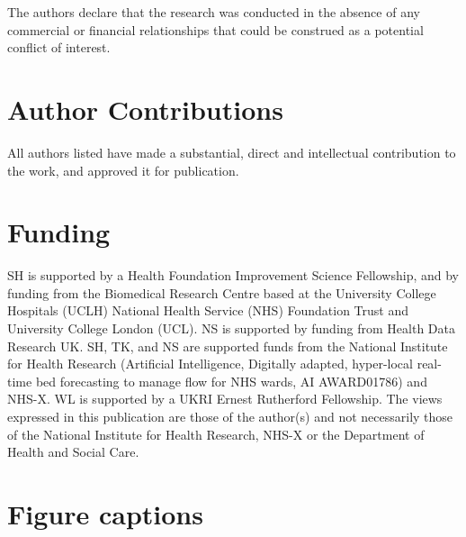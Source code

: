 \documentclass[utf8]{FrontiersinVancouver}
\begin{document}
The authors declare that the research was conducted in the absence of any commercial or financial relationships that could be construed as a potential conflict of interest.

\section*{Author Contributions}
All authors listed have made a substantial, direct and intellectual contribution to the work, and approved it for publication.

\section*{Funding}

SH is supported by a Health Foundation Improvement Science Fellowship, and by funding from  the Biomedical Research Centre based at the University College Hospitals (UCLH) National Health Service (NHS) Foundation Trust and University College London (UCL). NS is supported by funding from Health Data Research UK. SH, TK, and NS are supported funds from the National Institute for Health Research (Artificial Intelligence, Digitally adapted, hyper-local real-time bed forecasting to manage flow for NHS wards, AI AWARD01786) and NHS-X.  WL is supported by a UKRI Ernest Rutherford Fellowship.
The views expressed in this publication are those of the author(s) and not necessarily those of the National Institute for Health Research, NHS-X or the Department of Health and Social Care.


 



\section*{Figure captions}

\end{document}
